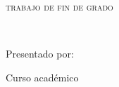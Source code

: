 
\begin{titlepage}
  \AddToShipoutPicture*{\BackgroundPic}

  \begin{addmargin}[2.575cm]{0cm}
  \begin{flushleft}
    \Large
    \hfill\vfil

    \textsf{\miFacultadC}
    \hfill\vfil

    \textsf{\miFacultadI}
    \vfill\vfill

    {\huge\textsf\miGrado} \vfill


    \textsc{trabajo de fin de grado}

    \begingroup
    \Huge{\miTitulo} \\ \bigskip
    \endgroup

    \vfill\vfill\vfill\vfill

    \textsf{\normalsize{Presentado por:}}\\
    {\Large\textrm{\miNombre}}

    \vfill
    \textsf{Curso académico \miCurso}
  \end{flushleft}
  \end{addmargin}

\end{titlepage}
\cleardoublepage
\endinput

